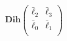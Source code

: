 \documentclass[preview]{standalone}
\begin{document}
\begin{align*}
\mathbf{Dih}\begin{pmatrix}    \bar{\ell}_2 & \bar{\ell}_3\\    \bar{\ell}_0 & \bar{\ell}_1\\\end{pmatrix}
\end{align*}
\end{document}
